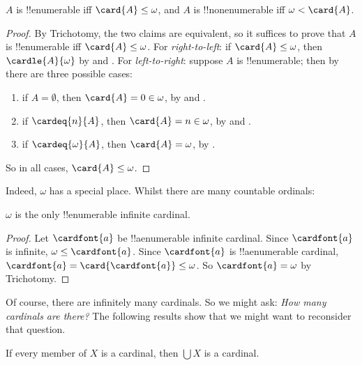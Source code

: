 \documentclass[../../../include/open-logic-section]{subfiles}
\begin{document}
\begin{prop}
$A$ is !!{enumerable} iff $\card{A} \leq \omega$, and $A$ is
!!{nonenumerable} iff $\omega < \card{A}$.
\end{prop}

\begin{proof}
By Trichotomy, the two claims are equivalent, so it suffices to prove
that $A$ is !!{enumerable} iff $\card{A} \leq \omega$. For
\emph{right-to-left}: if $\card{A} \leq \omega$, then
$\cardle{A}{\omega}$ by
 and
. For \emph{left-to-right}: suppose $A$ is
!!{enumerable}; then by  there
are three possible cases:
\begin{enumerate}
	\item if $A = \emptyset$, then $\card{A} = 0 \in \omega$, by
	 and
	.
	\item if $\cardeq{n}{A}$, then $\card{A} = n \in \omega$, by
	 and
	.
	\item if $\cardeq{\omega}{A}$, then $\card{A} = \omega$, by .
\end{enumerate}
So in all cases, $\card{A} \leq \omega$. 
\end{proof}
\noindent
Indeed, $\omega$ has a special place. Whilst there are many countable ordinals:

\begin{cor}
$\omega$ is the only !!{enumerable} infinite cardinal.
\end{cor}

\begin{proof}
Let $\cardfont{a}$ be !!a{enumerable} infinite cardinal. Since
$\cardfont{a}$ is infinite, $\omega \leq \cardfont{a}$. Since
$\cardfont{a}$ is !!a{enumerable} cardinal, $\cardfont{a} =
\card{\cardfont{a}} \leq \omega$. So $\cardfont{a} = \omega$ by
Trichotomy. \end{proof}

Of course, there are infinitely many cardinals. So we might ask:
\emph{How many cardinals are there?} The following results show that
we might want to reconsider that question.

\begin{prop}
If every member of $X$ is a cardinal, then $\bigcup X$ is a cardinal.
\end{prop}
\end{document}
